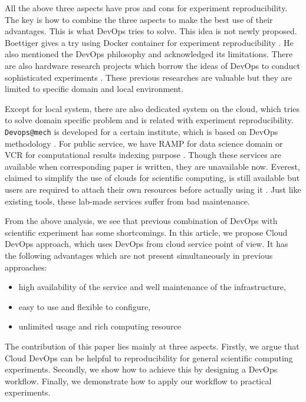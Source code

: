 \documentclass[10pt, conference, compsocconf]{IEEEtran}
\begin{document}
All the above three aspects have pros and cons for experiment reproducibility. The key is how to combine the three aspects to make the best use of their advantages. This is what DevOps tries to solve. This idea is not newly proposed. Boettiger gives a try using Docker container for experiment reproducibility \cite{Boettiger15}.
He also mentioned the DevOps philosophy and acknowledged its limitations.
There are also hardware research projects which borrow the ideas of DevOps to conduct sophisticated experiments \cite{chwalisz2019walker}. These previous researches are valuable but they are limited to specific domain and local environment.

Except for local system, there are also dedicated system on the cloud, which tries to solve domain specific problem and is related with experiment reproducibility. \texttt{Devops@mech} is developed for a certain institute, which is based on DevOps methodology \cite{philips2019devops}. For public service, we have RAMP for data science domain \cite{kegl2018ramp} or VCR for computational results indexing purpose \cite{GavishD12}. Though these services are available when corresponding paper is written, they are unavailable now.
Everest, claimed to simplify the use of clouds for scientific computing, is still available but users are required to attach their own resources before actually using it \cite{VOLKOV2017112}.
Just like existing tools, these lab-made services suffer from bad maintenance.

From the above analysis, we see that previous combination of DevOps with scientific experiment has some shortcomings. In this article, we propose Cloud DevOps approach, which uses DevOps from cloud service point of view. It has the following advantages which are not present simultaneously in previous approaches:
\begin{itemize}
	\item high availability of the service and well maintenance of the infrastructure,
	\item easy to use and flexible to configure,
	\item unlimited usage and rich computing resource
\end{itemize}

The contribution of this paper lies mainly at three aspects. Firstly, we argue that Cloud DevOps can be helpful to reproducibility for general scientific computing experiments. Secondly, we show how to achieve this by designing a
DevOps workflow. Finally, we demonstrate how to apply our workflow to practical experiments.
\end{document}

